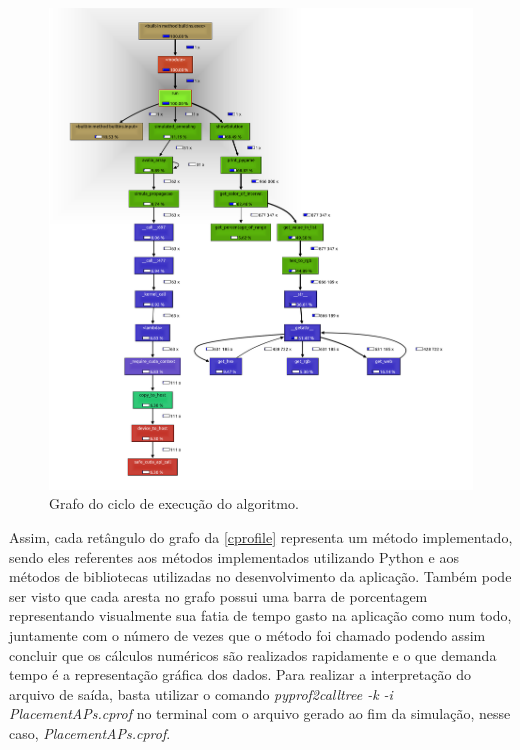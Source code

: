 \documentclass[
	12pt,				%
	twoside,			%
	a4paper,			%
	english,			%
	french,				%
	spanish,			%
	brazil				%
	]{abntex2}
\begin{document}
\begin{figure}[ht]
    \caption{\label{cprofile} Grafo do ciclo de execução do algoritmo.}
    \begin{center}
        \includegraphics[scale=0.48]{imagens/graph.jpg}
    \end{center}
\end{figure}

Assim, cada retângulo do grafo da \autoref{cprofile} representa um
método implementado, sendo eles referentes aos métodos implementados
utilizando Python e aos métodos de bibliotecas utilizadas no
desenvolvimento da aplicação. Também pode ser visto que cada aresta no
grafo possui uma barra de porcentagem representando visualmente sua
fatia de tempo gasto na aplicação como num todo, juntamente com o número
de vezes que o método foi chamado podendo assim concluir que os cálculos
numéricos são realizados rapidamente e o que demanda tempo é a
representação gráfica dos dados. Para realizar a interpretação do
arquivo de saída, basta utilizar o comando \emph{pyprof2calltree -k -i
PlacementAPs.cprof} no terminal com o arquivo gerado ao fim da
simulação, nesse caso, \emph{PlacementAPs.cprof}.
\end{document}
